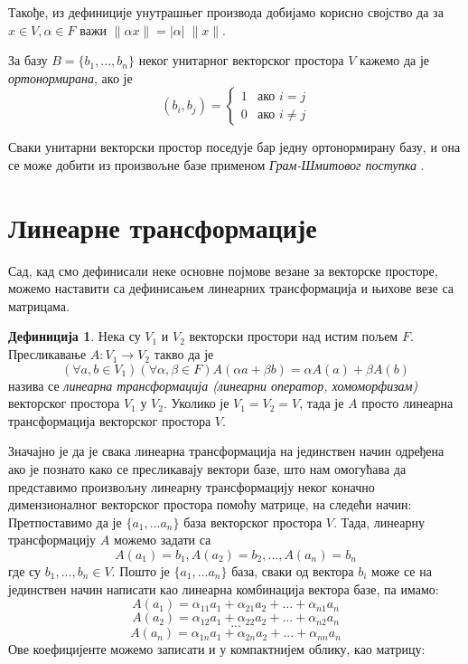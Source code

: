 \documentclass{report}
\theoremstyle{plain}
\theoremstyle{definition}
\newtheorem*{defn}{Дефиниција}
\begin{document}
Такође, из дефиниције унутрашњег производа добијамо корисно својство да за $x\in V, \alpha \in F$ важи $\|\alpha x\| = |\alpha|\; \|x\|$.

За базу $B=\{b_1, ..., b_n\}$ неког унитарног векторског простора $V$ кажемо да је \emph{ортонормирана}, ако је
$$(b_i, b_j) = \begin{cases}
                1 & \mbox{ако } i=j \\
                0 & \mbox{ако } i\neq j
               \end{cases}$$

Сваки унитарни векторски простор поседује бар једну ортонормирану базу, и она се може добити из произвољне базе применом \emph{Грам-Шмитовог поступка} \cite{milic}.

\section{Линеарне трансформације}
Сад, кад смо дефинисали неке основне појмове везане за векторске просторе, можемо наставити са дефинисањем линеарних трансформација и њихове везе са матрицама.
\begin{defn}
Нека су $V_1$ и $V_2$ векторски простори над истим пољем $F$. Пресликавање $A: V_1\to V_2$ такво да је
$$(\forall a, b\in V_1)(\forall \alpha, \beta \in F) A(\alpha a+ \beta b) = \alpha A(a) + \beta A(b)$$
назива се \emph{линеарна трансформација (линеарни оператор, хомоморфизам)} векторског простора $V_1$ у $V_2$. Уколико је $V_1 = V_2 = V$, тада је $A$ просто линеарна трансформација векторског простора $V$.
\end{defn}
Значајно је да је свака линеарна трансформација на јединствен начин одређена ако је познато како се пресликавају вектори базе, што нам омогућава да представимо произвољну линеарну трансформацију неког коначно димензионалног векторског простора помоћу матрице, на следећи начин:\\
Претпоставимо да је $\{a_1, ...a_n\}$ база векторског простора $V$. Тада, линеарну трансформацију $A$ можемо задати са
$$A(a_1) = b_1, A(a_2) = b_2, ..., A(a_n) = b_n$$
где су $b_1, ..., b_n\in V$. Пошто је $\{a_1, ...a_n\}$ база, сваки од вектора $b_i$ може се на јединствен начин написати као линеарна комбинација вектора базе, па имамо:
$$A(a_1) = \alpha_{11}a_1 + \alpha_{21}a_2 + ... + \alpha_{n1}a_n$$
$$A(a_2) = \alpha_{12}a_1 + \alpha_{22}a_2 + ... + \alpha_{n2}a_n$$
$$...$$
$$A(a_n) = \alpha_{1n}a_1 + \alpha_{2n}a_2 + ... + \alpha_{nn}a_n$$
Ове коефицијенте можемо записати и у компактнијем облику, као матрицу:
\end{document}
